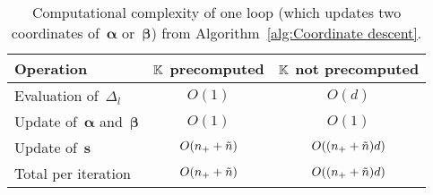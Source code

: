 \begin{table}
  \centering
  \begin{tabular}{lcc} 
    \toprule
    Operation
      & $\mathbb{K}$ precomputed
      & $\mathbb{K}$ not precomputed \\
    \midrule
    Evaluation of~$\Delta_l$
      & $O(1)$
      & $O(d)$ \\
    Update of~$\bm{\alpha}$ and~$\bm{\beta}$
      & $O(1)$
      & $O(1)$ \\
    Update of~$\bm{s}$
      & $O(n_{+} + \tilde{n})$
      & $O((n_{+} + \tilde{n})d)$ \\
    \midrule
    Total per iteration
      & $O(n_{+} + \tilde{n})$
      & $O((n_{+} + \tilde{n})d)$ \\
    \bottomrule
  \end{tabular}
  \caption{Computational complexity of one \repeatloop loop (which updates two coordinates of~$\bm{\alpha}$ or~$\bm{\beta}$) from Algorithm~\ref{alg:Coordinate descent}.}
  \label{tab:Computational complexity}
\end{table}